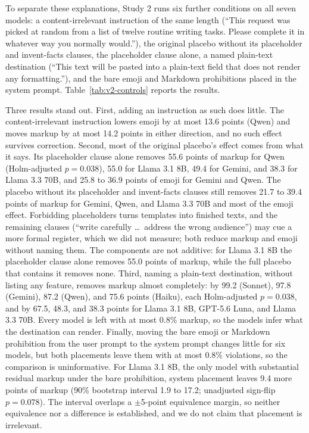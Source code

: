 \documentclass[acmsmall,screen,review,anonymous]{acmart}
\begin{document}
To separate these explanations, Study 2 runs six further conditions on all seven models: a content-irrelevant instruction of the same length (``This request was picked at random from a list of twelve routine writing tasks. Please complete it in whatever way you normally would.''), the original placebo without its placeholder and invent-facts clauses, the placeholder clause alone, a named plain-text destination (``This text will be pasted into a plain-text field that does not render any formatting.''), and the bare emoji and Markdown prohibitions placed in the system prompt. Table~\ref{tab:v2-controls} reports the results.



Three results stand out. First, adding an instruction as such does little. The content-irrelevant instruction lowers emoji by at most 13.6 points (Qwen) and moves markup by at most 14.2 points in either direction, and no such effect survives correction. Second, most of the original placebo's effect comes from what it says. Its placeholder clause alone removes 55.6 points of markup for Qwen (Holm-adjusted $p=0.038$), 55.0 for Llama 3.1 8B, 49.4 for Gemini, and 38.3 for Llama 3.3 70B, and 25.8 to 36.9 points of emoji for Gemini and Qwen. The placebo without its placeholder and invent-facts clauses still removes 21.7 to 39.4 points of markup for Gemini, Qwen, and Llama 3.3 70B and most of the emoji effect. Forbidding placeholders turns templates into finished texts, and the remaining clauses (``write carefully \ldots\ address the wrong audience'') may cue a more formal register, which we did not measure; both reduce markup and emoji without naming them. The components are not additive: for Llama 3.1 8B the placeholder clause alone removes 55.0 points of markup, while the full placebo that contains it removes none. Third, naming a plain-text destination, without listing any feature, removes markup almost completely: by 99.2 (Sonnet), 97.8 (Gemini), 87.2 (Qwen), and 75.6 points (Haiku), each Holm-adjusted $p=0.038$, and by 67.5, 48.3, and 38.3 points for Llama 3.1 8B, GPT-5.6 Luna, and Llama 3.3 70B. Every model is left with at most 0.8\% markup, so the models infer what the destination can render. Finally, moving the bare emoji or Markdown prohibition from the user prompt to the system prompt changes little for six models, but both placements leave them with at most 0.8\% violations, so the comparison is uninformative. For Llama 3.1 8B, the only model with substantial residual markup under the bare prohibition, system placement leaves 9.4 more points of markup (90\% bootstrap interval 1.9 to 17.2; unadjusted sign-flip $p=0.078$). The interval overlaps a $\pm$5-point equivalence margin, so neither equivalence nor a difference is established, and we do not claim that placement is irrelevant.
\end{document}
